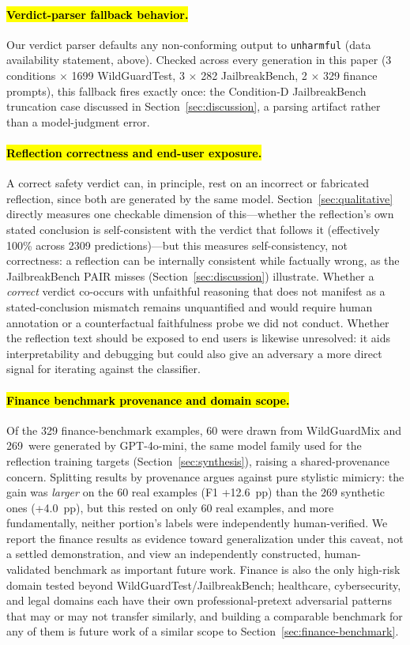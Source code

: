 \documentclass[superintelligence,article,accept,moreauthors]{Definitions/mdpi}
\begin{document}
\paragraph{\hl{Verdict-parser fallback behavior.}}
Our verdict parser defaults any non-conforming output to \texttt{unharmful} (data availability statement, above). Checked across every generation in this paper (3 conditions $\times$ 1699 WildGuardTest, 3 $\times$ 282 JailbreakBench, 2 $\times$ 329 finance prompts), this fallback fires exactly once: the Condition-D JailbreakBench truncation case discussed in Section~\ref{sec:discussion}, a parsing artifact rather than a model-judgment error.

\paragraph{\hl{Reflection correctness and end-user exposure.}}
A correct safety verdict can, in principle, rest on an incorrect or fabricated reflection, since both are generated by the same model. Section~\ref{sec:qualitative} directly measures one checkable dimension of this---whether the reflection's own stated conclusion is self-consistent with the verdict that follows it (effectively 100\% across 2309 predictions)---but this measures self-consistency, not correctness: a reflection can be internally consistent while factually wrong, as the JailbreakBench PAIR misses (Section~\ref{sec:discussion}) illustrate. Whether a \emph{correct} verdict co-occurs with unfaithful reasoning that does not manifest as a stated-conclusion mismatch remains unquantified and would require human annotation or a counterfactual faithfulness probe we did not conduct. Whether the reflection text should be exposed to end users is likewise unresolved: it aids interpretability and debugging but could also give an adversary a more direct signal for iterating against the classifier.

\paragraph{\hl{Finance benchmark provenance and domain scope.}}
Of the 329 finance-benchmark examples, 60 were drawn from WildGuardMix and 269~were generated by GPT-4o-mini, the same model family used for the reflection training targets (Section~\ref{sec:synthesis}), raising a shared-provenance concern. Splitting results by provenance argues against pure stylistic mimicry: the gain was \emph{larger} on the 60 real examples (F1 +12.6~pp) than the 269 synthetic ones (+4.0~pp), but this rested on only 60 real examples, and more fundamentally, neither portion's labels were independently human-verified. We report the finance results as evidence toward generalization under this caveat, not a settled demonstration, and view an independently constructed, human-validated benchmark as important future work. Finance is also the only high-risk domain tested beyond WildGuardTest/JailbreakBench; healthcare, cybersecurity, and legal domains each have their own professional-pretext adversarial patterns that may or may not transfer similarly, and building a comparable benchmark for any of them is future work of a similar scope to Section~\ref{sec:finance-benchmark}.
\end{document}
